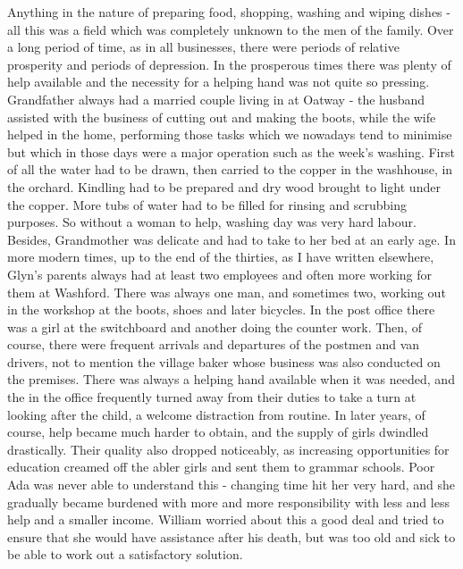 Anything in the nature of preparing food, shopping, washing and wiping dishes - all this was a field which was completely unknown to the men of the family. Over a long period of time, as in all businesses, there were periods of relative prosperity and periods of depression. In the prosperous times there was plenty of help available and the necessity for a helping hand was not quite so pressing. Grandfather always had a married couple living in at Oatway - the husband assisted with the business of cutting out and making the boots, while the wife helped in the home, performing those tasks which we nowadays tend to minimise but which in those days were a major operation such as the week's washing. First of all the water had to be drawn, then carried to the copper in the washhouse, in the orchard. Kindling had to be prepared and dry wood brought to light under the copper. More tubs of water had to be filled for rinsing and scrubbing purposes. So without a woman to help, washing day was very hard labour. Besides, Grandmother was delicate and had to take to her bed at an early age. In more modern times, up to the end of the thirties, as I have written elsewhere, Glyn's parents always had at least two employees and often more working for them at Washford. There was always one man, and sometimes two, working out in the workshop at the boots, shoes and later bicycles. In the post office there was a girl at the switchboard and another doing the counter work. Then, of course, there were frequent arrivals and departures of the postmen and van drivers, not to mention the village baker whose business was also conducted on the premises. There was always a helping hand available when it was needed, and the  in the office frequently turned away from their duties to take a turn at looking after the child, a welcome distraction from routine. In later years, of course, help became much harder to obtain, and the supply of girls dwindled drastically. Their quality also dropped noticeably, as increasing opportunities for education creamed off the abler girls and sent them to grammar schools. Poor Ada was never able to understand this - changing time hit her very hard, and she gradually became burdened with more and more responsibility with less and less help and a smaller income. William worried about this a good deal and tried to ensure that she would have assistance after his death, but was too old and sick to be able to work out a satisfactory solution.

